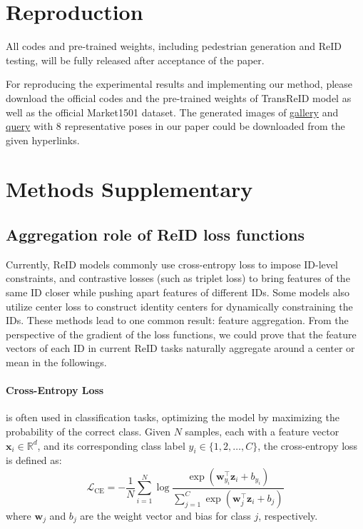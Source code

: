 \clearpage
\setcounter{page}{1}
\maketitlesupplementary


\section{Reproduction}
All codes and pre-trained weights, including pedestrian generation and ReID testing, will be fully released after acceptance of the paper.

For reproducing the experimental results and implementing our method, please download the official codes and the pre-trained weights of TransReID model as well as the official Market1501 dataset. The generated images of \href{https://drive.google.com/file/d/1QdH0CctiUrZTCE3nPzc_kPmgAaxhhWzd/view?usp=sharing}{gallery} and \href{https://drive.google.com/file/d/1oiOutY64FQn9RTF2l_T0A8iPCWMkJi3a/view?usp=sharing}{query} with 8 representative poses in our paper could be downloaded from the given hyperlinks.





\section{Methods Supplementary}
\subsection{Aggregation role of ReID loss functions}
Currently, ReID models commonly use cross-entropy loss to impose ID-level constraints, and contrastive losses (such as triplet loss) to bring features of the same ID closer while pushing apart features of different IDs. Some models also utilize center loss to construct identity centers for dynamically constraining the IDs. These methods lead to one common result: feature aggregation. From the perspective of the gradient of the loss functions, we could prove that the feature vectors of each ID in current ReID tasks naturally aggregate around a center or mean in the followings.
\paragraph{Cross-Entropy Loss} 
is often used in classification tasks, optimizing the model by maximizing the probability of the correct class. Given $N$ samples, each with a feature vector $\mathbf{x}_i \in \mathbb{R}^d$, and its corresponding class label $y_i \in \{1, 2, \dots, C\}$, the cross-entropy loss is defined as:
\begin{equation}
\mathcal{L}_{\text{CE}} = -\frac{1}{N} \sum_{i=1}^{N} \log \frac{\exp(\mathbf{w}_{y_i}^\top \mathbf{z}_i + b_{y_i})}{\sum_{j=1}^{C} \exp(\mathbf{w}_j^\top \mathbf{z}_i + b_j)}
\end{equation}
where $\mathbf{w}_j$ and $b_j$ are the weight vector and bias for class $j$, respectively.


